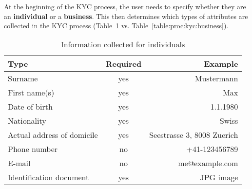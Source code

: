 At the beginning of the KYC process, the user needs to specify
whether they are an {\bf individual} or a {\bf business}. This
then determines which types of attributes are collected in the
KYC process (Table~\ref{table:proc:kyc:individual} vs.
Table~\ref{table:proc:kyc:business}).

\begin{table}
  \caption{Information collected for individuals}
  \label{table:proc:kyc:individual}
  \begin{center}
    \begin{tabular}{l|c|r}
      {\bf Type}                 & {\bf Required}    & {\bf Example} \\ \hline \hline
      Surname                    & yes        & Mustermann \\
      First name(s)              & yes        & Max \\
      Date of birth              & yes        & 1.1.1980 \\
      Nationality                & yes        & Swiss \\
      Actual address of domicile & yes        & Seestrasse 3, 8008 Zuerich \\
      Phone number               & no         & +41-123456789 \\
      E-mail                     & no         & me@example.com \\
      Identification document    & yes        & JPG image \\
  \end{tabular}
  \end{center}
\end{table}


